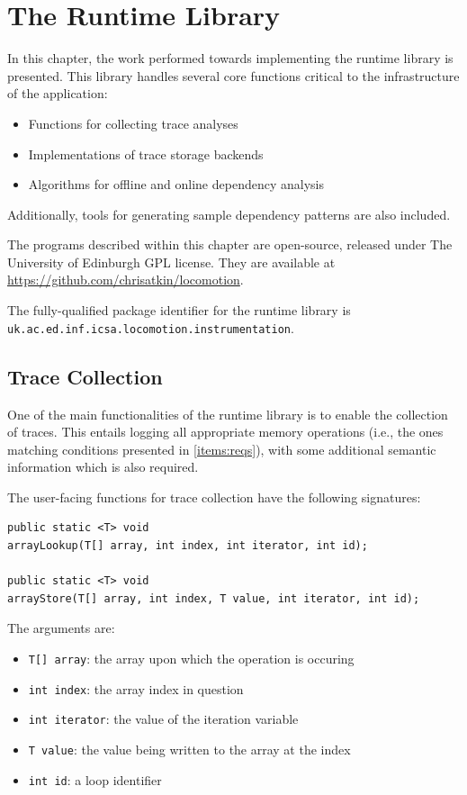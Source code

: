 \chapter{The Runtime Library} \label{sec:runtime}
In this chapter, the work performed towards implementing the runtime library is presented. This library handles several core functions critical to the infrastructure of the application:

\begin{itemize}
	\item Functions for collecting trace analyses
	\item Implementations of trace storage backends
	\item Algorithms for offline and online dependency analysis
\end{itemize}

Additionally, tools for generating sample dependency patterns are also included.

The programs described within this chapter are open-source, released under The University of Edinburgh GPL license. They are available at \url{https://github.com/chrisatkin/locomotion}.

The fully-qualified package identifier for the runtime library is\\\texttt{uk.ac.ed.inf.icsa.locomotion.instrumentation}.

\section{Trace Collection} \label{sec:runtime/trace-collection}
One of the main functionalities of the runtime library is to enable the collection of traces. This entails logging all appropriate memory operations (i.e., the ones matching conditions presented in \ref{items:reqs}), with some additional semantic information which is also required.

The user-facing functions for trace collection have the following signatures:

\begin{verbatim}
public static <T> void
arrayLookup(T[] array, int index, int iterator, int id);

public static <T> void
arrayStore(T[] array, int index, T value, int iterator, int id);
\end{verbatim}

The arguments are:

\begin{itemize} \label{items:trace-args}
	\item \texttt{T[] array}: the array upon which the operation is occuring
	\item \texttt{int index}: the array index in question
	\item \texttt{int iterator}: the value of the iteration variable
	\item \texttt{T value}: the value being written to the array at the index
	\item \texttt{int id}: a loop identifier
\end{itemize}

